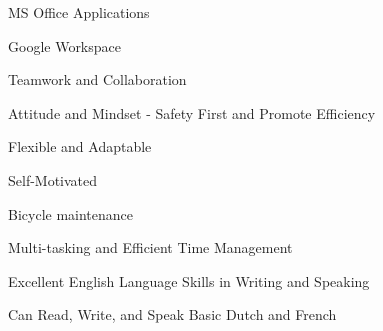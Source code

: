 



\begin{cvparagraph}



\begin{cventries}
  \cventry
{} %
{} %
{} %
{} %
{ %
\begin{cvitems*}
	\item{MS Office Applications}
	\item{Google Workspace}
	\item{Teamwork and Collaboration}
	\item{Attitude and Mindset - Safety First and Promote Efficiency}
	\item{Flexible and Adaptable}
	\item{Self-Motivated}
	\item{Bicycle maintenance}
	\item{Multi-tasking and Efficient Time Management}
	\item{Excellent English Language Skills in Writing and Speaking}
	\item{Can Read, Write, and Speak Basic Dutch and French}
\end{cvitems*}
}
\end{cventries}



\end{cvparagraph}
